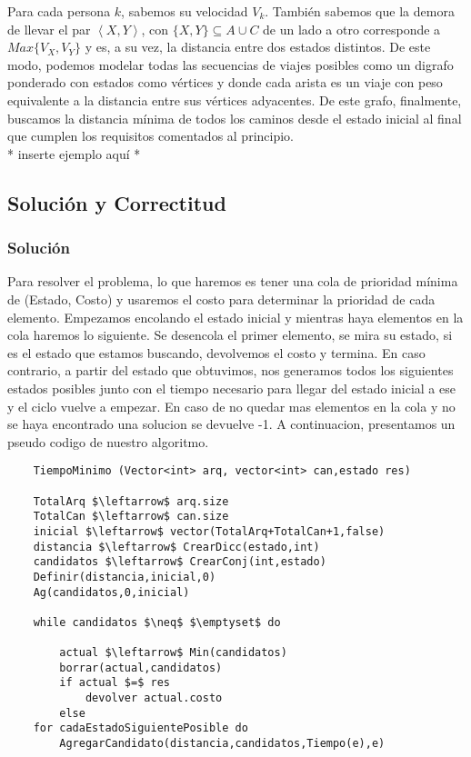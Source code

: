 		Para cada persona $k$, sabemos su velocidad $V_k$. También sabemos que la demora de llevar el par $\left \langle {X, Y} \right \rangle$, con $\{X,Y\} \subseteq A \cup C$ de un lado a otro corresponde a $Max\{ V_{X}, V_{Y}  \}$ y es, a su vez, la distancia entre dos estados distintos. De este modo, podemos modelar todas las secuencias de viajes posibles como un digrafo ponderado con estados como vértices y donde cada arista es un viaje con peso equivalente a la distancia entre sus vértices adyacentes. De este grafo, finalmente, buscamos la distancia mínima de todos los caminos desde el estado inicial al final que cumplen los requisitos comentados al principio.
		\\

		* inserte ejemplo aquí *

\subsection{Solución y Correctitud}
	\subsubsection{Solución}


	Para resolver el problema, lo que haremos es tener una cola de prioridad mínima de (Estado, Costo) y usaremos el costo para determinar la prioridad de cada elemento.
	Empezamos encolando el estado inicial y mientras haya elementos en la cola haremos lo siguiente.
	Se desencola el primer elemento, se mira su estado, si es el estado que estamos buscando, devolvemos el costo y termina.
	En caso contrario, a partir del estado que obtuvimos, nos generamos todos los siguientes estados posibles junto con el tiempo necesario para llegar del estado inicial a ese y el ciclo vuelve a empezar.
	En caso de no quedar mas elementos en la cola y no se haya encontrado una solucion se devuelve -1.
	A continuacion, presentamos un pseudo codigo de nuestro algoritmo.


\lstset{basicstyle=\large}
\begin{lstlisting}
	TiempoMinimo (Vector<int> arq, vector<int> can,estado res)

	TotalArq $\leftarrow$ arq.size
	TotalCan $\leftarrow$ can.size
	inicial $\leftarrow$ vector(TotalArq+TotalCan+1,false)
	distancia $\leftarrow$ CrearDicc(estado,int)
	candidatos $\leftarrow$ CrearConj(int,estado)
	Definir(distancia,inicial,0)
	Ag(candidatos,0,inicial)

	while candidatos $\neq$ $\emptyset$ do

		actual $\leftarrow$ Min(candidatos)
		borrar(actual,candidatos)
		if actual $=$ res
			devolver actual.costo
		else
	for cadaEstadoSiguientePosible do
		AgregarCandidato(distancia,candidatos,Tiempo(e),e)

\end{lstlisting}


